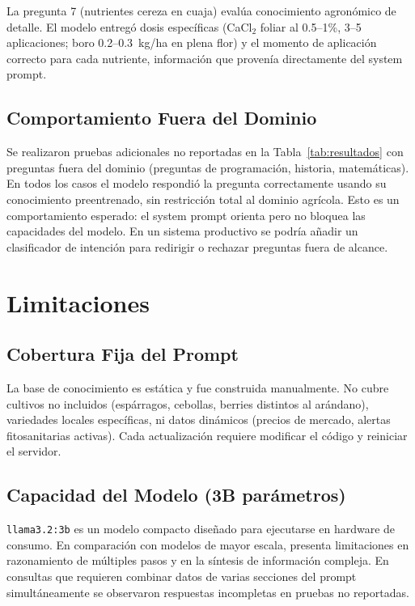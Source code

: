 \documentclass{IEEEtran}
\begin{document}
La pregunta 7 (nutrientes cereza en cuaja) evalúa conocimiento agronómico
de detalle. El modelo entregó dosis específicas (CaCl$_2$ foliar al
0.5--1\%, 3--5 aplicaciones; boro 0.2--0.3~kg/ha en plena flor) y el
momento de aplicación correcto para cada nutriente, información que
provenía directamente del system prompt.

\subsection{Comportamiento Fuera del Dominio}

Se realizaron pruebas adicionales no reportadas en la Tabla~\ref{tab:resultados}
con preguntas fuera del dominio (preguntas de programación, historia,
matemáticas). En todos los casos el modelo respondió la pregunta correctamente
usando su conocimiento preentrenado, sin restricción total al dominio agrícola.
Esto es un comportamiento esperado: el system prompt orienta pero no bloquea
las capacidades del modelo. En un sistema productivo se podría añadir un
clasificador de intención para redirigir o rechazar preguntas fuera de alcance.

\section{Limitaciones}

\subsection{Cobertura Fija del Prompt}

La base de conocimiento es estática y fue construida manualmente.
No cubre cultivos no incluidos (espárragos, cebollas, berries distintos
al arándano), variedades locales específicas, ni datos dinámicos
(precios de mercado, alertas fitosanitarias activas).
Cada actualización requiere modificar el código y reiniciar el servidor.

\subsection{Capacidad del Modelo (3B parámetros)}

\texttt{llama3.2:3b} es un modelo compacto diseñado para ejecutarse en
hardware de consumo. En comparación con modelos de mayor escala, presenta
limitaciones en razonamiento de múltiples pasos y en la síntesis de
información compleja. En consultas que requieren combinar datos de varias
secciones del prompt simultáneamente se observaron respuestas incompletas
en pruebas no reportadas.
\end{document}
